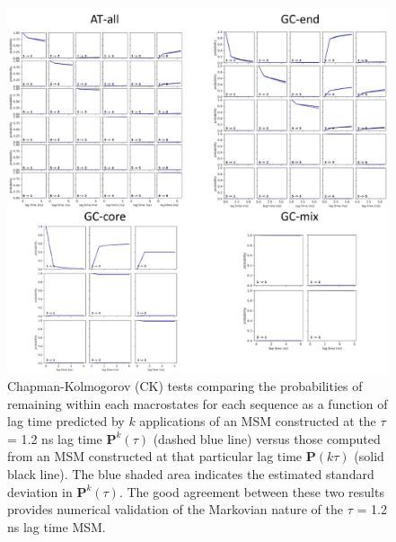 \documentclass[journal=jpcbfk,manuscript=article]{achemso}
\begin{document}
\begin{figure}[ht!]
	\begin{center}
        \includegraphics[width=1.0\textwidth]{FigS3.pdf}
        \caption{Chapman-Kolmogorov (CK) tests comparing the probabilities of remaining within each macrostates for each sequence as a function of lag time predicted by $k$ applications of an MSM constructed at the $\tau$ = 1.2 ns lag time $\mathbf{P}^k(\tau)$ (dashed blue line) versus those computed from an MSM constructed at that particular lag time $\mathbf{P}(k \tau)$ (solid black line). The blue shaded area indicates the estimated standard deviation in $\mathbf{P}^k(\tau)$. The good agreement between these two results provides numerical validation of the Markovian nature of the $\tau$ = 1.2 ns lag time MSM.}
        \label{fig:SIFig3}
	\end{center}
\end{figure}

\clearpage
\newpage
\end{document}
